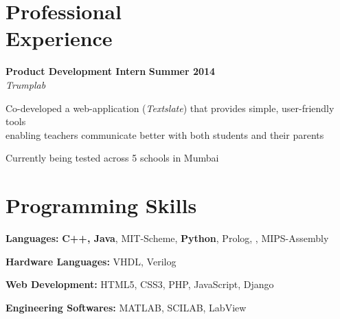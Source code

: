 \documentclass[margin,11pt]{resume}
\begin{document}
\begin{resume}
\section{\mysidestyle Professional \\ Experience}
\textbf{Product Development Intern} \hfill \textbf{Summer 2014}\\
\textsl{Trumplab}\\
\vspace{-4mm}
\begin{list2}
\item Co-developed a web-application (\textsl{Textslate}) that provides simple, user-friendly tools\\ enabling teachers communicate better with both students and their parents
\item Currently being tested across 5 schools in Mumbai
\end{list2}
 
\section{\mysidestyle Programming Skills}
\begin{list2}
\item \textbf{Languages:} \textbf{C++, Java}, MIT-Scheme, \textbf{Python}, Prolog, \LaTeXe{}, MIPS-Assembly
\item \textbf{Hardware Languages:} VHDL, Verilog
\item \textbf{Web Development:} HTML5, CSS3, PHP, JavaScript, Django
\item \textbf{Engineering Softwares:} MATLAB, SCILAB, LabView
\end{list2}


\end{resume}
\end{document}
